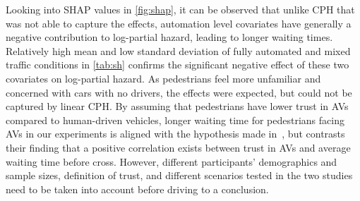 Looking into SHAP values in \cref{fig:shap}, it can be observed that unlike CPH that was not able to capture the effects, automation level covariates have generally a negative contribution to log-partial hazard, leading to longer waiting times. Relatively high mean and low standard deviation of fully automated and mixed traffic conditions in \cref{tab:sh} confirms the significant negative effect of these two covariates on log-partial hazard. As pedestrians feel more unfamiliar and concerned with cars with no drivers, the effects were expected, but could not be captured by linear CPH. By assuming that pedestrians have lower trust in AVs compared to human-driven vehicles, longer waiting time for pedestrians facing AVs in our experiments is aligned with the hypothesis made in~\citep{jayaraman2019pedestrian}, but contrasts their finding that a positive correlation exists between trust in AVs and average waiting time before cross. However, different participants' demographics and sample sizes, definition of trust, and different scenarios tested in the two studies need to be taken into account before driving to a conclusion.
